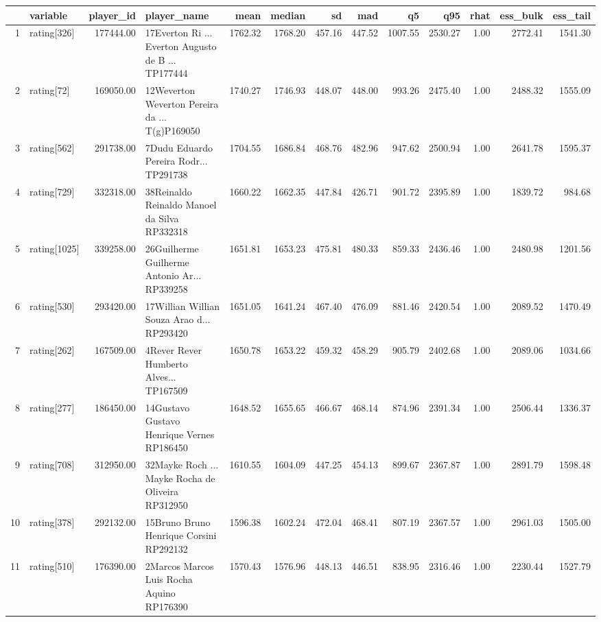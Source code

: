 \begin{table}[ht]
\centering
\begin{tabular}{rlrlrrrrrrrrr}
  \hline
 & variable & player\_id & player\_name & mean & median & sd & mad & q5 & q95 & rhat & ess\_bulk & ess\_tail \\ 
  \hline
1 & rating[326] & 177444.00 & 17Everton Ri ... Everton Augusto de B ... TP177444 & 1762.32 & 1768.20 & 457.16 & 447.52 & 1007.55 & 2530.27 & 1.00 & 2772.41 & 1541.30 \\ 
  2 & rating[72] & 169050.00 & 12Weverton Weverton Pereira da ... T(g)P169050 & 1740.27 & 1746.93 & 448.07 & 448.00 & 993.26 & 2475.40 & 1.00 & 2488.32 & 1555.09 \\ 
  3 & rating[562] & 291738.00 & 7Dudu Eduardo Pereira Rodr... TP291738 & 1704.55 & 1686.84 & 468.76 & 482.96 & 947.62 & 2500.94 & 1.00 & 2641.78 & 1595.37 \\ 
  4 & rating[729] & 332318.00 & 38Reinaldo Reinaldo Manoel da Silva RP332318 & 1660.22 & 1662.35 & 447.84 & 426.71 & 901.72 & 2395.89 & 1.00 & 1839.72 & 984.68 \\ 
  5 & rating[1025] & 339258.00 & 26Guilherme Guilherme Antonio Ar... RP339258 & 1651.81 & 1653.23 & 475.81 & 480.33 & 859.33 & 2436.46 & 1.00 & 2480.98 & 1201.56 \\ 
  6 & rating[530] & 293420.00 & 17Willian Willian Souza Arao d... RP293420 & 1651.05 & 1641.24 & 467.40 & 476.09 & 881.46 & 2420.54 & 1.00 & 2089.52 & 1470.49 \\ 
  7 & rating[262] & 167509.00 & 4Rever Rever Humberto Alves... TP167509 & 1650.78 & 1653.22 & 459.32 & 458.29 & 905.79 & 2402.68 & 1.00 & 2089.06 & 1034.66 \\ 
  8 & rating[277] & 186450.00 & 14Gustavo Gustavo Henrique Vernes RP186450 & 1648.52 & 1655.65 & 466.67 & 468.14 & 874.96 & 2391.34 & 1.00 & 2506.44 & 1336.37 \\ 
  9 & rating[708] & 312950.00 & 32Mayke Roch ... Mayke Rocha de Oliveira RP312950 & 1610.55 & 1604.09 & 447.25 & 454.13 & 899.67 & 2367.87 & 1.00 & 2891.79 & 1598.48 \\ 
  10 & rating[378] & 292132.00 & 15Bruno Bruno Henrique Corsini RP292132 & 1596.38 & 1602.24 & 472.04 & 468.41 & 807.19 & 2367.57 & 1.00 & 2961.03 & 1505.00 \\ 
  11 & rating[510] & 176390.00 & 2Marcos Marcos Luis Rocha Aquino RP176390 & 1570.43 & 1576.96 & 448.13 & 446.51 & 838.95 & 2316.46 & 1.00 & 2230.44 & 1527.79 \\ 

\end{tabular}
\end{table}
